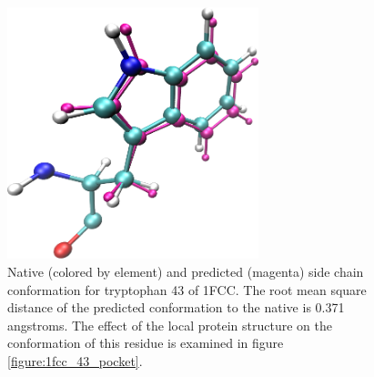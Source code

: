 \begin{figure}[h]
  \centering
  \includegraphics[width=0.65\textwidth,height=0.3\textheight,keepaspectratio]{figures/mutation_side_chain_images/1fcc_43.png}
  \caption{Native (colored by element) and predicted (magenta) side chain conformation for tryptophan 43 of 1FCC.
The root mean square distance of the predicted conformation to the native is 0.371 angstroms.
The effect of the local protein structure on the conformation of this residue is examined in figure \protect\ref{figure:1fcc_43_pocket}.}
  \label{figure:computational_mutation_scanning/1FCC_43}
\end{figure}


